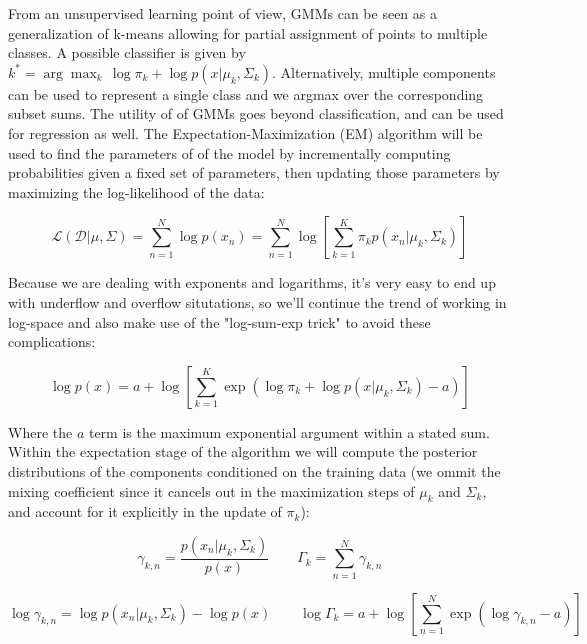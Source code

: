 \documentclass{article}
\begin{document}
From an unsupervised learning point of view, GMMs can be seen as a generalization of k-means allowing for partial assignment of points to multiple classes. A possible classifier is given by $k^{*} = \arg\max_k \, \log \pi_{k} + \log p(x \lvert \mu_k, \Sigma_k)$. Alternatively, multiple components can be used to represent a single class and we argmax over the corresponding subset sums. The utility of of GMMs goes beyond classification, and can be used for regression as well. The Expectation-Maximization (EM) algorithm will be used to find the parameters of of the model by incrementally computing probabilities given a fixed set of parameters, then updating those parameters by maximizing the log-likelihood of the data:

\begin{equation}
	\mathcal{L} \left( \mathcal{D} \lvert \mu, \Sigma \right) = \sum_{n = 1}^{N} \log p(x_n) = \sum_{n=1}^{N} \log{ \left [ \sum_{k = 1}^{K} \pi_{k} p \left( x_n \lvert \mu_k, \Sigma_k \right ) \right ] }
	\label{eqn:loglikelihood}
\end{equation}

Because we are dealing with exponents and logarithms, it's very easy to end up with underflow and overflow situtations, so we'll continue the trend of working in log-space and also make use of the "log-sum-exp trick" to avoid these complications:

\begin{equation}
	\log p( x ) = a + \log \left[ \sum_{k = 1}^{K} \exp{ \left( \log \pi_{k} + \log p(x \lvert \mu_k, \Sigma_k) - a \right ) } \right ]
\end{equation}

Where the $a$ term is the maximum exponential argument within a stated sum. Within the expectation stage of the algorithm we will compute the posterior distributions of the components conditioned on the training data (we ommit the mixing coefficient since it cancels out in the maximization steps of $\mu_k$ and $\Sigma_k$, and account for it explicitly in the update of $\pi_k$):

\begin{equation}
	\gamma_{k, n} = \frac{ p \left ( x_n \lvert \mu_k, \Sigma_k \right ) }{ p(x) } \qquad \Gamma_k = \sum_{n=1}^{N} \gamma_{k, n}
\end{equation}

\begin{equation}
	\log \gamma_{k, n} =  \log p \left ( x_n \lvert \mu_k, \Sigma_k \right )  - \log p(x) \qquad \log \Gamma_k = a + \log \left [ \sum_{n=1}^{N} \exp{ \left( \log \gamma_{k, n} - a \right )} \right ]
\end{equation}
\end{document}
